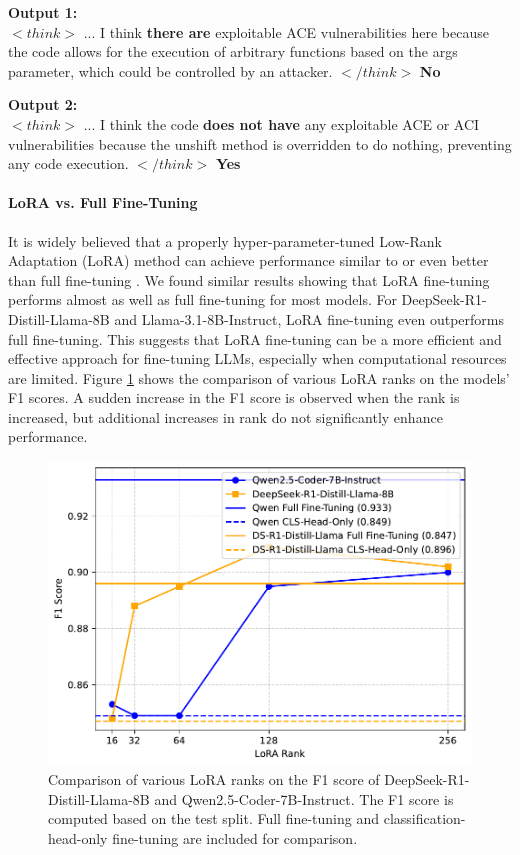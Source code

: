 \documentclass[12pt,openany,oneside,table]{cmuthesis}
\begin{document}
\begin{tcolorbox}[colback=white, colframe=black]
    \noindent
    \begin{minipage}[t]{0.45\textwidth}
      \small
      \textbf{Output 1:}\\[1ex]
      $<think>$ ... I think \textbf{there are} exploitable ACE vulnerabilities here because the code allows for the execution of arbitrary functions based on the args parameter, which could be controlled by an attacker.
      $</think>$
      \textbf{No}
    \end{minipage}\hfill
    \begin{minipage}[t]{0.45\textwidth}
      \small
      \textbf{Output 2:}\\[1ex]
      $<think>$ ... I think the code \textbf{does not have} any exploitable ACE or ACI vulnerabilities because the unshift method is overridden to do nothing, preventing any code execution.
      $</think>$
      \textbf{Yes}
    \end{minipage}
\end{tcolorbox}

\paragraph{LoRA vs. Full Fine-Tuning}
It is widely believed that a properly hyper-parameter-tuned Low-Rank Adaptation (LoRA) method can achieve performance similar to or even better than full fine-tuning \cite{qlora,lora,mao2025survey}.
We found similar results showing that LoRA fine-tuning performs almost as well as full fine-tuning for most models. For DeepSeek-R1-Distill-Llama-8B and Llama-3.1-8B-Instruct, LoRA fine-tuning even outperforms full fine-tuning. This suggests that LoRA fine-tuning can be a more efficient and effective approach for fine-tuning LLMs, especially when computational resources are limited. Figure \ref{fig:lora_plot} shows the comparison of various LoRA ranks on the models' F1 scores. A sudden increase in the F1 score is observed when the rank is increased, but additional increases in rank do not significantly enhance performance.

\begin{figure}
  \centering
  \includegraphics[width=0.6\linewidth]{figures/lora_plot.pdf}
  \caption{Comparison of various LoRA ranks on the F1 score of DeepSeek-R1-Distill-Llama-8B and Qwen2.5-Coder-7B-Instruct. The F1 score is computed based on the test split. Full fine-tuning and classification-head-only fine-tuning are included for comparison.}
  \label{fig:lora_plot}
\end{figure}
\end{document}
